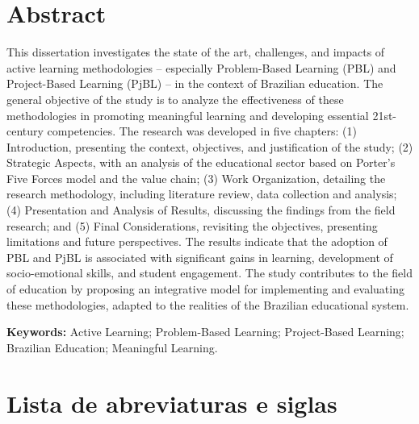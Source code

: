 \documentclass[12pt,a4paper,twoside,openright]{book}
\begin{document}
\newpage

\chapter*{Abstract}

This dissertation investigates the state of the art, challenges, and impacts of active learning methodologies -- especially Problem-Based Learning (PBL) and Project-Based Learning (PjBL) -- in the context of Brazilian education. The general objective of the study is to analyze the effectiveness of these methodologies in promoting meaningful learning and developing essential 21st-century competencies. The research was developed in five chapters: (1) Introduction, presenting the context, objectives, and justification of the study; (2) Strategic Aspects, with an analysis of the educational sector based on Porter's Five Forces model and the value chain; (3) Work Organization, detailing the research methodology, including literature review, data collection and analysis; (4) Presentation and Analysis of Results, discussing the findings from the field research; and (5) Final Considerations, revisiting the objectives, presenting limitations and future perspectives. The results indicate that the adoption of PBL and PjBL is associated with significant gains in learning, development of socio-emotional skills, and student engagement. The study contributes to the field of education by proposing an integrative model for implementing and evaluating these methodologies, adapted to the realities of the Brazilian educational system.

\textbf{Keywords:} Active Learning; Problem-Based Learning; Project-Based Learning; Brazilian Education; Meaningful Learning.

\newpage

\listoffigures
{}

\newpage

\listoftables
{}

\newpage

\chapter*{Lista de abreviaturas e siglas}
\end{document}

